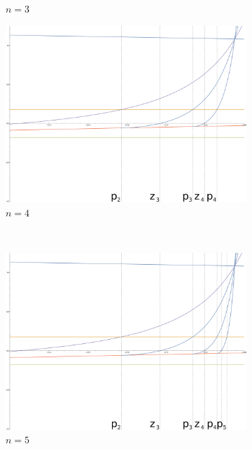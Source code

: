 \begin{figure}[ht]
\begin{subfigure}[b]{0.5\textwidth}
				\caption{$n=3$}
				\label{fig:cplot2H}
		\end{subfigure}
		\begin{subfigure}[b]{0.5\textwidth}
				\includegraphics[width=\textwidth]{./img/cplot3H}
				\caption{$n=4$}
				\label{fig:cplot3H}
		\end{subfigure}%
		~ %
		\begin{subfigure}[b]{0.5\textwidth}
				\includegraphics[width=\textwidth]{./img/cplot4H}
				\caption{$n=5$}
				\label{fig:cplot4H}
		\end{subfigure}
		\begin{subfigure}[b]{0.5\textwidth}

\end{subfigure}
\end{figure}
